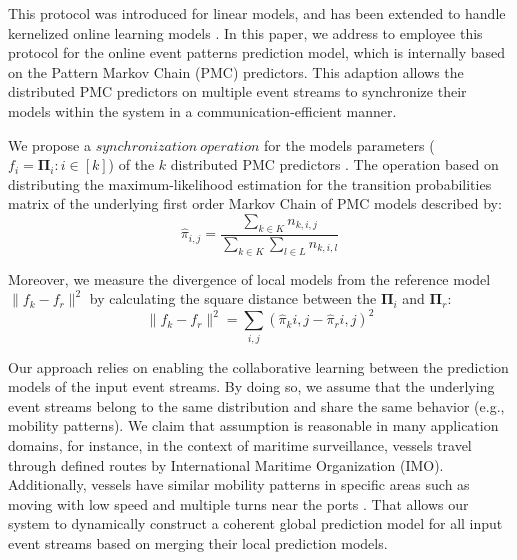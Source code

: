 \par This protocol was introduced for linear models, and has been  extended to handle kernelized online learning models \cite{kamp2016communication}. In this paper, we address to employee this protocol for the online event patterns prediction model, which is internally based on the Pattern Markov Chain (PMC) predictors. This adaption allows the distributed PMC predictors on multiple event streams to  synchronize their models within the system in a communication-efficient manner. 



\par We propose a $synchronization\ operation$ for the models parameters ($f_i=\boldsymbol{\Pi}_i :i \in[k]$) of the $k$ distributed PMC predictors . The operation based on distributing the maximum-likelihood estimation \cite{anderson1957statistical} for the transition probabilities matrix of the underlying first order Markov Chain of PMC models described by: 
\begin{equation*}
\label{eq:dis_pi_estim}
\hat{\pi}_{i,j}=\frac{\sum_{k \in K} n_{k,i,j}}{\sum_{k \in K} \sum_{l \in L} n_{k,i,l}}
\end{equation*}

\par Moreover, we measure the divergence of local models from the reference model  $\|f_k - f_r\|^2$ by calculating the square distance between the  $\boldsymbol{\Pi}_i$ and  $\boldsymbol{\Pi}_r$:
\begin{equation*}
\label{eq:dis_pi_varinace}
\|f_k - f_r\|^2=\sum_{i,j} (\hat{\pi}_k{i,j} -\hat{\pi}_r{i,j})^2
\end{equation*}
\par Our approach relies on enabling the collaborative learning between the prediction models of  the input event streams. By doing so, we assume that the underlying event streams belong to the same  distribution and share the same behavior (e.g., mobility patterns). We claim that assumption is reasonable in many application domains, for instance, in the context of maritime surveillance, vessels travel through defined routes by International Maritime Organization (IMO). Additionally, vessels have similar mobility patterns in specific areas such as moving with low speed and multiple turns near the ports \cite{pallotta2013vessel,liu2014knowledge}. That allows our system to dynamically construct a coherent global prediction model for all input event streams based on merging their local prediction models.

